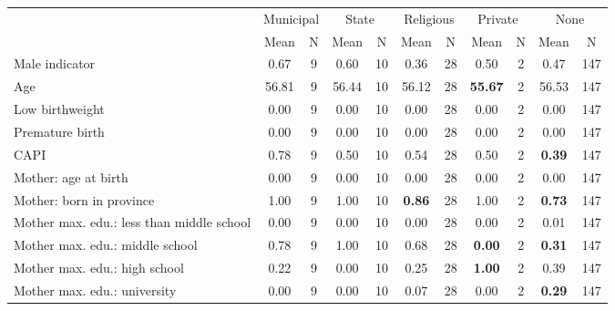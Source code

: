 \begin{tabular}{l c c c c c c c c c c}
\toprule
& \multicolumn{2}{c}{Municipal} & \multicolumn{2}{c}{State} & \multicolumn{2}{c}{Religious} & \multicolumn{2}{c}{Private} & \multicolumn{2}{c}{None} \\
& \scriptsize Mean & \scriptsize N & \scriptsize Mean & \scriptsize N & \scriptsize Mean & \scriptsize N & \scriptsize Mean & \scriptsize N & \scriptsize Mean & \scriptsize N \\
\midrule
Male indicator &      0.67 &         9 &      0.60 &        10 &      0.36 &        28 &      0.50 &         2 &      0.47 &       147 \\
Age &     56.81 &         9 &     56.44 &        10 &     56.12 &        28 & \textbf{    55.67} &         2 &     56.53 &       147 \\
Low birthweight &      0.00 &         9 &      0.00 &        10 &      0.00 &        28 &      0.00 &         2 &      0.00 &       147 \\
Premature birth &      0.00 &         9 &      0.00 &        10 &      0.00 &        28 &      0.00 &         2 &      0.00 &       147 \\
CAPI &      0.78 &         9 &      0.50 &        10 &      0.54 &        28 &      0.50 &         2 & \textbf{     0.39} &       147 \\
Mother: age at birth &      0.00 &         9 &      0.00 &        10 &      0.00 &        28 &      0.00 &         2 &      0.00 &       147 \\
Mother: born in province &      1.00 &         9 &      1.00 &        10 & \textbf{     0.86} &        28 &      1.00 &         2 & \textbf{     0.73} &       147 \\
Mother max. edu.: less than middle school &      0.00 &         9 &      0.00 &        10 &      0.00 &        28 &      0.00 &         2 &      0.01 &       147 \\
Mother max. edu.: middle school &      0.78 &         9 &      1.00 &        10 &      0.68 &        28 & \textbf{     0.00} &         2 & \textbf{     0.31} &       147 \\
Mother max. edu.: high school &      0.22 &         9 &      0.00 &        10 &      0.25 &        28 & \textbf{     1.00} &         2 &      0.39 &       147 \\
Mother max. edu.: university &      0.00 &         9 &      0.00 &        10 &      0.07 &        28 &      0.00 &         2 & \textbf{     0.29} &       147 \\

\end{tabular}
